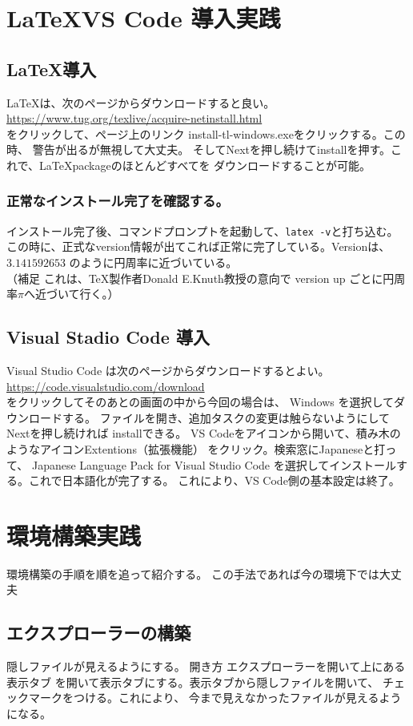 \documentclass{ltjsarticle}
\begin{document}
\section{\LaTeX VS Code 導入実践}

\subsection{\LaTeX 導入}
\LaTeX は、次のページからダウンロードすると良い。\\
\url{https://www.tug.org/texlive/acquire-netinstall.html}\\
をクリックして、ページ上のリンク install-tl-windows.exeをクリックする。この時、
警告が出るが無視して大丈夫。
そしてNextを押し続けてinstallを押す。これで、\LaTeX packageのほとんどすべてを
ダウンロードすることが可能。
\subsubsection*{正常なインストール完了を確認する。}
インストール完了後、コマンドプロンプトを起動して、\verb|latex -v|と打ち込む。
この時に、正式なversion情報が出てこれば正常に完了している。Versionは、$3.141592653$
のように円周率に近づいている。\\
（補足 これは、\TeX 製作者Donald E.Knuth教授の意向で
version up ごとに円周率$\pi$へ近づいて行く。）
\subsection{Visual Stadio Code 導入}
Visual Studio Code は次のページからダウンロードするとよい。\\
\url{https://code.visualstudio.com/download}\\
をクリックしてそのあとの画面の中から今回の場合は、
Windows を選択してダウンロードする。
ファイルを開き、追加タスクの変更は触らないようにしてNextを押し続ければ
installできる。
VS Codeをアイコンから開いて、積み木のようなアイコンExtentions（拡張機能）
をクリック。検索窓にJapaneseと打って、
Japanese Language Pack for Visual Studio Code
を選択してインストールする。これで日本語化が完了する。
これにより、VS Code側の基本設定は終了。
\section{環境構築実践}
環境構築の手順を順を追って紹介する。
この手法であれば今の環境下では大丈夫
\subsection{エクスプローラーの構築}
隠しファイルが見えるようにする。
開き方 エクスプローラーを開いて上にある表示タブ
を開いて表示タブにする。表示タブから隠しファイルを開いて、
チェックマークをつける。これにより、
今まで見えなかったファイルが見えるようになる。
\end{document}

